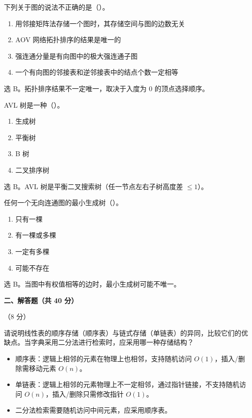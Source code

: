\begin{question}
下列关于图的说法不正确的是（\quad）。
\begin{enumerate}
  \item 用邻接矩阵法存储一个图时，其存储空间与图的边数无关
  \item AOV 网络拓扑排序的结果是唯一的
  \item 强连通分量是有向图中的极大强连通子图
  \item 一个有向图的邻接表和逆邻接表中的结点个数一定相等
\end{enumerate}
\begin{solution}
选 B。拓扑排序结果不一定唯一，取决于入度为 $0$ 的顶点选择顺序。
\end{solution}
\end{question}

\begin{question}
AVL 树是一种（\quad）。
\begin{enumerate}
  \item 生成树
  \item 平衡树
  \item B 树
  \item 二叉排序树
\end{enumerate}
\begin{solution}
选 B。AVL 树是平衡二叉搜索树（任一节点左右子树高度差 $\le1$）。
\end{solution}
\end{question}

\begin{question}
任何一个无向连通图的最小生成树（\quad）。
\begin{enumerate}
  \item 只有一棵
  \item 有一棵或多棵
  \item 一定有多棵
  \item 可能不存在
\end{enumerate}
\begin{solution}
选 B。当图中有权值相等的边时，最小生成树可能不唯一。
\end{solution}
\end{question}

\clearpage

\textbf{二、解答题（共 40 分）}

\begin{question}[线性表存储结构比较]（8 分）

请说明线性表的顺序存储（顺序表）与链式存储（单链表）的异同，比较它们的优缺点。当字典采用二分法进行检索时，应采用哪一种存储结构？

\begin{solution}
\begin{itemize}
  \item 顺序表：逻辑上相邻的元素在物理上也相邻，支持随机访问 $O(1)$，插入/删除需移动元素 $O(n)$。
  \item 单链表：逻辑上相邻的元素物理上不一定相邻，通过指针链接，不支持随机访问 $O(n)$，插入/删除只需修改指针 $O(1)$。
  \item 二分法检索需要随机访问中间元素，应采用顺序表。
\end{itemize}
\end{solution}
\end{question}

